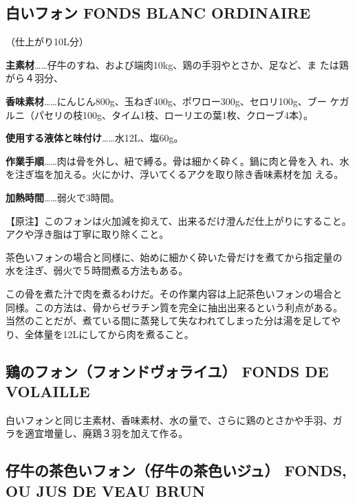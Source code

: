 \documentclass[twoside,12Q,b5paper]{escoffierltjsbook}
\newenvironment{recette}{\begin{multicols}{2}}{\end{multicols}}
\begin{document}
\begin{recette}
\subsection{白いフォン FONDS BLANC
ORDINAIRE}\label{ux767dux3044ux30d5ux30a9ux30f3-fonds-blanc-ordinaire}

（仕上がり10L分）

\textbf{主素材}\ldots{}\ldots{}仔牛のすね、および端肉10kg、鶏の手羽やとさか、足など、ま
たは鶏がら４羽分、

\textbf{香味素材}\ldots{}\ldots{}にんじん800g、玉ねぎ400g、ポワロー300g、セロリ100g、ブー
ケガルニ（パセリの枝100g、タイム1枝、ローリエの葉1枚、クローブ4本）。

\textbf{使用する液体と味付け}\ldots{}\ldots{}水12L、塩60g。

\textbf{作業手順}\ldots{}\ldots{}肉は骨を外し、紐で縛る。骨は細かく砕く。鍋に肉と骨を入
れ、水を注ぎ塩を加える。火にかけ、浮いてくるアクを取り除き香味素材を加
える。

\textbf{加熱時間}\ldots{}\ldots{}弱火で3時間。

【原注】このフォンは火加減を抑えて、出来るだけ澄んだ仕上がりにすること。
アクや浮き脂は丁寧に取り除くこと。

茶色いフォンの場合と同様に、始めに細かく砕いた骨だけを煮てから指定量の
水を注ぎ、弱火で５時間煮る方法もある。

この骨を煮た汁で肉を煮るわけだ。その作業内容は上記茶色いフォンの場合と
同様。この方法は、骨からゼラチン質を完全に抽出出来るという利点がある。
当然のことだが、煮ている間に蒸発して失なわれてしまった分は湯を足してや
り、全体量を12Lにしてから肉を煮ること。

\subsection{鶏のフォン（フォンドヴォライユ） FONDS DE
VOLAILLE}\label{ux9d8fux306eux30d5ux30a9ux30f3ux30d5ux30a9ux30f3ux30c9ux30f4ux30a9ux30e9ux30a4ux30e6-fonds-de-volaille}

白いフォンと同じ主素材、香味素材、水の量で、さらに鶏のとさかや手羽、ガ
ラを適宜増量し、廃鶏３羽を加えて作る。

\subsection{仔牛の茶色いフォン（仔牛の茶色いジュ） FONDS, OU JUS DE VEAU
BRUN}\label{ux4ed4ux725bux306eux8336ux8272ux3044ux30d5ux30a9ux30f3ux4ed4ux725bux306eux8336ux8272ux3044ux30b8ux30e5-fonds-ou-jus-de-veau-brun}


\end{recette}
\end{document}
